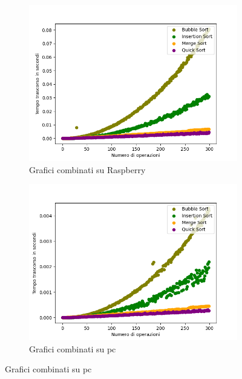 \documentclass{article}
\begin{document}
			\begin{figure}[h]
				\centering
				
				\begin{subfigure}{0.75\textwidth}
					\centering
					\includegraphics[width = \textwidth]{./Plots/Raspberry_CombinedTimestamps.png}
					\caption{Grafici combinati su Raspberry}
				\end{subfigure}
				\begin{subfigure}{0.75\textwidth}
					\centering
					\includegraphics[width = \textwidth]{./Plots/Pc_CombinedTimestamps.png}
					\caption{Grafici combinati su pc}
				\end{subfigure}

			\end{figure}
	
\end{document}
